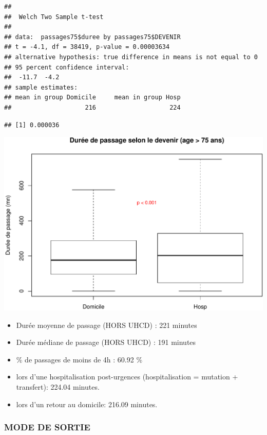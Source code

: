 \documentclass[]{article}
\begin{document}
\begin{verbatim}
## 
##  Welch Two Sample t-test
## 
## data:  passages75$duree by passages75$DEVENIR
## t = -4.1, df = 38419, p-value = 0.00003634
## alternative hypothesis: true difference in means is not equal to 0
## 95 percent confidence interval:
##  -11.7  -4.2
## sample estimates:
## mean in group Domicile     mean in group Hosp 
##                    216                    224
\end{verbatim}

\begin{verbatim}
## [1] 0.000036
\end{verbatim}

\includegraphics{rapport2014_V4_files/figure-latex/duree_passage_75-1.pdf}

\begin{itemize}
\itemsep1pt\parskip0pt
\item
  Durée moyenne de passage (HORS UHCD) : 221 minutes
\item
  Durée médiane de passage (HORS UHCD) : 191 minutes
\item
  \% de passages de moins de 4h : 60.92 \%
\item
  lors d'une hospitalisation post-urgences (hospitalisation = mutation +
  transfert): 224.04 minutes.
\item
  lors d'un retour au domicile: 216.09 minutes.
\end{itemize}

\subsubsection{MODE DE SORTIE}\label{mode-de-sortie-1}
\end{document}
